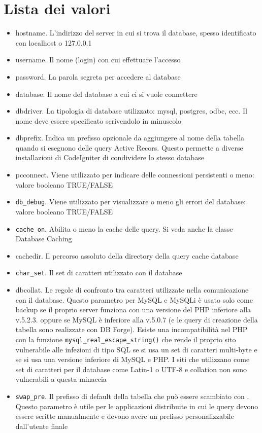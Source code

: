 \section*{Lista dei valori}
\begin{itemize}
\item hostname. L'indirizzo del server in cui si trova il database, spesso identificato con localhost o 127.0.0.1
\item username. Il nome (login) con cui effettuare l'accesso
\item password. La parola segreta per accedere al database
\item database. Il nome del database a cui ci si vuole connettere
\item dbdriver. La tipologia di database utilizzato: mysql, postgres, odbc, ecc. Il nome deve essere specificato scrivendolo in minuscolo
\item dbprefix. Indica un prefisso opzionale da aggiungere al nome della tabella quando si eseguono delle query Active Recors. Questo permette a diverse installazioni di CodeIgniter di condividere lo stesso database
\item pcconnect. Viene utilizzato per indicare delle connessioni persistenti o meno: valore booleano TRUE/FALSE
\item \verb|db_debug|. Viene utilizzato per visualizzare o meno gli errori del database: valore booleano TRUE/FALSE
\item \verb|cache_on|. Abilita o meno la cache delle query. Si veda anche la classe Database Caching
\item cachedir. Il percorso assoluto della directory della query cache database
\item \verb|char_set|. Il set di caratteri utilizzato con il database
\item dbcollat. Le regole di confronto tra caratteri utilizzate nella comunicazione con il database. Questo parametro per MySQL e MySQLi è usato solo come backup se il proprio server funziona con una versione del PHP inferiore alla v.5.2.3. oppure se MySQL è inferiore alla v.5.0.7 (e le query di creazione della tabella sono realizzate con DB Forge). Esiste una incompatibilità nel PHP con la funzione \verb|mysql_real_escape_string()| che rende il proprio sito vulnerabile alle infezioni di tipo SQL se si usa un set di caratteri multi-byte e se si usa una versione inferiore di MySQL e PHP. I siti che utilizzano come set di caratteri per il database come Latin-1 o UTF-8 e collation non sono vulnerabili a questa minaccia
\item \verb|swap_pre|. Il prefisso di default della tabella che può essere scambiato con . Questo parametro è utile per le applicazioni distribuite in cui le query devono essere scritte manualmente e devono avere un prefisso personalizzabile dall'utente finale

\end{itemize}
